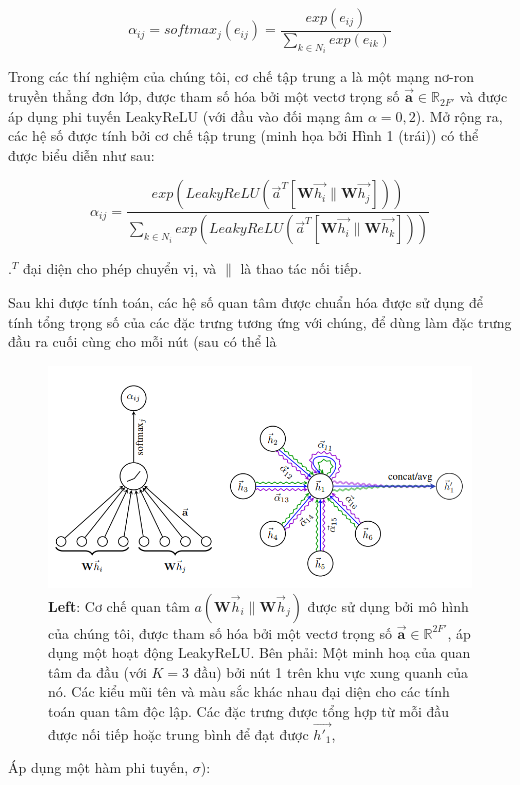 \[\alpha_{ij} = softmax_j{(e_{ij})} = \frac{ exp(e_{ij} ) }{{\displaystyle \sum}_{k \in N_i}exp(e_{ik})}\]

Trong các thí nghiệm của chúng tôi, cơ chế tập trung a là một mạng nơ-ron truyền thẳng đơn lớp, được tham số hóa bởi một vectơ trọng số 
\(\vec{\textbf{a}} \in \mathbb{R}_{2F'}\) 
và được áp dụng phi tuyến LeakyReLU (với đầu vào đối mạng âm $ \alpha = 0,2$). Mở rộng ra, các hệ số được tính bởi cơ chế tập trung (minh họa bởi Hình 1 (trái)) có thể được biểu diễn như sau:

\[
\alpha_{ij} = \frac
{exp(LeakyReLU(\vec{a}^T[\textbf{W}\vec{h_i}\|\textbf{W}\vec{h_j}]))}
{{\displaystyle \sum}_{k \in N_i} exp(LeakyReLU(\vec{a}^T[\textbf{W}\vec{h_i}\|\textbf{W}\vec{h_k}]))}
\]

$.^T$ đại diện cho phép chuyển vị, và $\|$ là thao tác nối tiếp. 

Sau khi được tính toán, các hệ số quan tâm được chuẩn hóa được sử dụng để tính tổng trọng số của các đặc trưng tương ứng với chúng, để dùng làm đặc trưng đầu ra cuối cùng cho mỗi nút (sau có thể là

\begin{figure} [!hp]
	\includegraphics[scale = 1]{Chapter1/Figs/Figure1.png}
	\caption{\textbf{Left}: Cơ chế quan tâm 
			\(a(\textbf{W}\vec{h}_i\|\textbf{W}\vec{h}_j)\)
			được sử dụng bởi mô hình của chúng tôi, được tham số hóa bởi một vectơ trọng số 
			\(\vec{\textbf{a}} \in \mathbb{R}^{2F'}\),
		   áp dụng một hoạt động LeakyReLU. Bên phải: Một minh hoạ của quan tâm đa đầu (với $K = 3$ đầu) bởi nút 1 trên khu vực xung quanh của nó. Các kiểu mũi tên và màu sắc khác nhau đại diện cho các tính toán quan tâm độc lập. Các đặc trưng được tổng hợp từ mỗi đầu được nối tiếp hoặc trung bình để đạt được $\vec{h'_1}$,}
	\label{fig:figure1}
\end{figure}
Áp dụng một hàm phi tuyến, $\sigma$):

